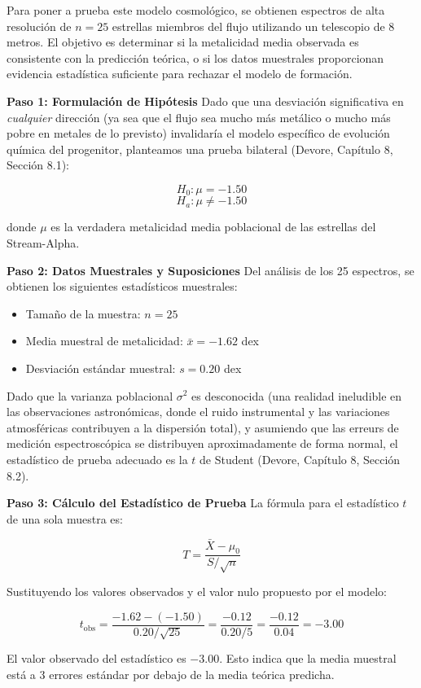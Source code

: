 Para poner a prueba este modelo cosmológico, se obtienen espectros de alta resolución de $n = 25$ estrellas miembros del flujo utilizando un telescopio de 8 metros. El objetivo es determinar si la metalicidad media observada es consistente con la predicción teórica, o si los datos muestrales proporcionan evidencia estadística suficiente para rechazar el modelo de formación.

\textbf{Paso 1: Formulación de Hipótesis}
Dado que una desviación significativa en \textit{cualquier} dirección (ya sea que el flujo sea mucho más metálico o mucho más pobre en metales de lo previsto) invalidaría el modelo específico de evolución química del progenitor, planteamos una prueba bilateral (Devore, Capítulo 8, Sección 8.1):

$$ H_0: \mu = -1.50 $$
$$ H_a: \mu \neq -1.50 $$

donde $\mu$ es la verdadera metalicidad media poblacional de las estrellas del Stream-Alpha.

\textbf{Paso 2: Datos Muestrales y Suposiciones}
Del análisis de los 25 espectros, se obtienen los siguientes estadísticos muestrales:
\begin{itemize}
    \item Tamaño de la muestra: $n = 25$
    \item Media muestral de metalicidad: $\bar{x} = -1.62$ dex
    \item Desviación estándar muestral: $s = 0.20$ dex
\end{itemize}

Dado que la varianza poblacional $\sigma^2$ es desconocida (una realidad ineludible en las observaciones astronómicas, donde el ruido instrumental y las variaciones atmosféricas contribuyen a la dispersión total), y asumiendo que las erreurs de medición espectroscópica se distribuyen aproximadamente de forma normal, el estadístico de prueba adecuado es la $t$ de Student (Devore, Capítulo 8, Sección 8.2).

\textbf{Paso 3: Cálculo del Estadístico de Prueba}
La fórmula para el estadístico $t$ de una sola muestra es:

$$ T = \frac{\bar{X} - \mu_0}{S / \sqrt{n}} $$

Sustituyendo los valores observados y el valor nulo propuesto por el modelo:

$$ t_{\text{obs}} = \frac{-1.62 - (-1.50)}{0.20 / \sqrt{25}} = \frac{-0.12}{0.20 / 5} = \frac{-0.12}{0.04} = -3.00 $$

El valor observado del estadístico es $-3.00$. Esto indica que la media muestral está a 3 errores estándar por debajo de la media teórica predicha.


